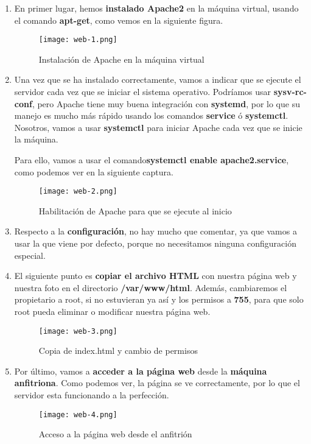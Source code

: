 \begin{enumerate}
    \item En primer lugar, hemos \textbf{instalado Apache2} en la máquina virtual, usando el comando \textbf{apt-get}, como vemos en la siguiente figura.

    \begin{figure}[H]
        \centering
        \texttt{[image: web-1.png]}
        \caption{Instalación de Apache en la máquina virtual}
    \end{figure}

    \item Una vez que se ha instalado correctamente, vamos a indicar que se ejecute el servidor cada vez que se iniciar el sistema operativo. Podríamos usar \textbf{sysv-rc-conf}, pero Apache tiene muy buena integración con \textbf{systemd}, por lo que su manejo es mucho más rápido usando los comandos \textbf{service} ó \textbf{systemctl}. Nosotros, vamos a usar \textbf{systemctl} para iniciar Apache cada vez que se inicie la máquina.

    Para ello, vamos a usar el comando\textbf{systemctl enable apache2.service}, como podemos ver en la siguiente captura.

    \begin{figure}[H]
        \centering
        \texttt{[image: web-2.png]}
        \caption{Habilitación de Apache para que se ejecute al inicio}
    \end{figure}

    \item Respecto a la \textbf{configuración}, no hay mucho que comentar, ya que vamos a usar la que viene por defecto, porque no necesitamos ninguna configuración especial.

    \item El siguiente punto es \textbf{copiar el archivo HTML} con nuestra página web y nuestra foto en el directorio \textbf{/var/www/html}. Además, cambiaremos el propietario a root, si no estuvieran ya así y los permisos a \textbf{755}, para que solo root pueda eliminar o modificar nuestra página web.

    \begin{figure}[H]
        \centering
        \texttt{[image: web-3.png]}
        \caption{Copia de index.html y cambio de permisos}
    \end{figure}

    \item Por último, vamos a \textbf{acceder a la página web} desde la \textbf{máquina anfitriona}. Como podemos ver, la página se ve correctamente, por lo que el servidor esta funcionando a la perfección.

    \begin{figure}[H]
        \centering
        \texttt{[image: web-4.png]}
        \caption{Acceso a la página web desde el anfitrión}
    \end{figure}
\end{enumerate}






%
%

